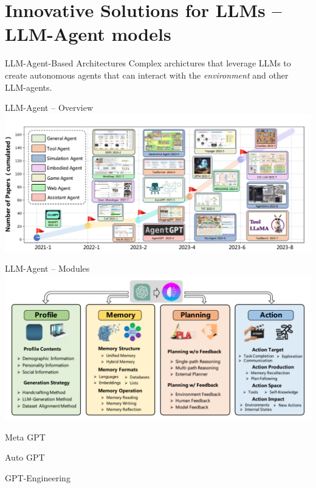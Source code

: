 \documentclass[presentation, 10pt]{beamer}\mode<presentation>{\usetheme{AMSBolognaFC}}
\begin{document}
\section{Innovative Solutions for LLMs -- LLM-Agent models}
\begin{frame}[plain]
\centering
\huge{LLM-Agent-Based Architectures}
\large{ 
Complex archictures that leverage LLMs to create autonomous agents that can interact with the \emph{environment} and other LLM-agents.
}
\end{frame}
\begin{frame}{LLM-Agent -- Overview}
	\includegraphics[width=\textwidth]{img/number-of-papers.png}
\end{frame}
\begin{frame}{LLM-Agent -- Modules}
	\includegraphics[width=\textwidth]{img/overview-agents.png}
\end{frame}
\begin{frame}{Meta GPT}

\end{frame}
\begin{frame}{Auto GPT}

\end{frame}
\begin{frame}{GPT-Engineering}

\end{frame}
\end{document}
